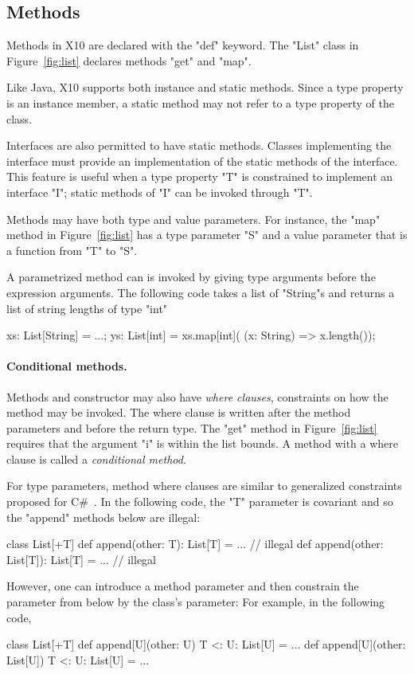 \documentclass[preprint,nocopyrightspace,9pt]{sigplanconf}
\begin{document}
\subsection{Methods}

Methods in X10 are declared with the \xcd"def" keyword.
The \xcd"List" class in Figure~\ref{fig:list} declares methods
\xcd"get" and \xcd"map".

Like Java, X10 supports both instance and static methods.
Since a type property is an instance member, a static method may
not refer to a type property of the class.

Interfaces are also permitted to have static methods.  Classes
implementing the interface must provide an implementation of the
static methods of the interface.
This feature is
useful when a type property \xcd"T" is constrained to implement
an interface \xcd"I"; static methods of \xcd"I" can be invoked
through \xcd"T".

Methods may have both type and value parameters.  
For instance, the \xcd"map" method in Figure~\ref{fig:list} 
has a type parameter \xcd"S" and a value parameter that is a
function from \xcd"T" to \xcd"S".

A parametrized method can is invoked by giving type arguments before the
expression arguments.  The following code takes a
list of \xcd"String"s and returns a list of string lengths of
type \xcd"int"
\begin{xten}
xs: List[String] = ...;
ys: List[int] = xs.map[int](
        (x: String) => x.length());
\end{xten}

\paragraph{Conditional methods.}

Methods and constructor may also have \emph{where clauses},
constraints on how
the method may be invoked.  The where clause is written after
the
method parameters and before the return type.  The \xcd"get" method in
Figure~\ref{fig:list} requires that the argument \xcd"i" is
within the list bounds.  A method with a where clause
is called a \emph{conditional method}.

For type parameters, method where clauses are 
similar to generalized constraints proposed for
C\#~\cite{emir06}.
%
In the following code, the \xcd"T" parameter is covariant
and so the \xcd"append" methods below are illegal:
\begin{xten}
class List[+T] {
   def append(other: T): List[T] = { ... }
        // illegal
   def append(other: List[T]): List[T] = { ... }
        // illegal
}
\end{xten}
%
However, one can introduce a method parameter and then constrain
the parameter from below by the class's parameter:
For example, in the following code,
\begin{xten}
class List[+T] {
   def append[U](other: U)
        {T <: U}: List[U] = { ... }
   def append[U](other: List[U])
        {T <: U}: List[U] = { ... }
}
\end{xten}
\end{document}
